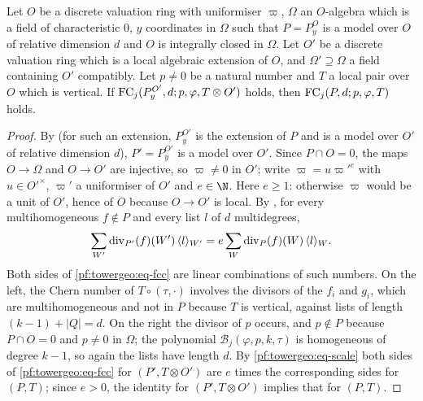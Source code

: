 \begin{lemma}\label{pf:towergeo:descent}
Let $O$ be a discrete valuation ring with uniformiser $\varpi$, $\Omega$ an $O$-algebra which is a field of
characteristic $0$, $y$ coordinates in $\Omega$ such that $P=P^O_y$ is a model over $O$ of relative
dimension $d$ and $O$ is integrally closed in $\Omega$. Let $O'$ be a discrete valuation ring which is a
local algebraic extension of $O$, and $\Omega'\supseteq\Omega$ a field containing $O'$ compatibly. Let
$p\ne0$ be a natural number and $T$ a local pair over $O$ which is vertical. If
$\mathrm{FC}_j(P^{O'}_y,d;p,\varphi,T\otimes O')$ holds, then $\mathrm{FC}_j(P,d;p,\varphi,T)$ holds.
\end{lemma}

\begin{proof}
By  (for such an extension, $P^{O'}_y$ is the extension
of $P$ and is a model over $O'$ of relative dimension $d$), $P'=P^{O'}_y$ is a model over $O'$. Since
$P\cap O=0$, the maps $O\to\Omega$ and $O\to O'$ are injective, so $\varpi\ne0$ in $O'$; write
$\varpi=u\varpi'^e$ with $u\in O'^\times$, $\varpi'$ a uniformiser of $O'$ and $e\in\N$. Here $e\ge1$:
otherwise $\varpi$ would be a unit of $O'$, hence of $O$ because $O\to O'$ is local. By
, for every multihomogeneous $f\notin P$ and every
list $l$ of $d$ multidegrees,
\begin{equation}\label{pf:towergeo:eq-scale}
\sum_{W'}\operatorname{div}_{P'}(f)(W')\,\langle l\rangle_{W'}=e\sum_W\operatorname{div}_P(f)(W)\,\langle l\rangle_W .
\end{equation}
Both sides of \eqref{pf:towergeo:eq-fcc} are linear combinations of such numbers. On the left, the Chern
number of $T\circ(\tau,\cdot)$ involves the divisors of the $f_i$ and $g_i$, which are multihomogeneous and
not in $P$ because $T$ is vertical, against lists of length $(k-1)+|Q|=d$. On the right the divisor of $p$
occurs, and $p\notin P$ because $P\cap O=0$ and $p\ne0$ in $\Omega$; the polynomial
$\mathcal B_j(\varphi,p,k,\tau)$ is homogeneous of degree $k-1$, so again the lists have length $d$. By
\eqref{pf:towergeo:eq-scale} both sides of \eqref{pf:towergeo:eq-fcc} for $(P',T\otimes O')$ are $e$ times
the corresponding sides for $(P,T)$; since $e>0$, the identity for $(P',T\otimes O')$ implies that for
$(P,T)$.
\end{proof}

